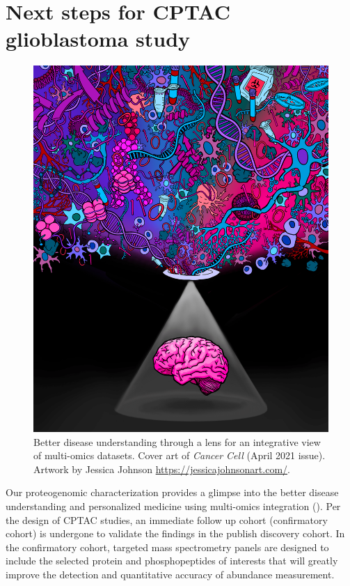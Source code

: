 \section{Next steps for CPTAC glioblastoma study}

\begin{figure}[tb]
    \centering
    \includegraphics[width=0.6\linewidth]{figures/chap05_conclusion/cptac_gbm_cancer_cell_cover.png}
    \caption[Better disease understanding through a lens for an integrative view of multi-omics datasets.]{Better disease understanding through a lens for an integrative view of multi-omics datasets. Cover art of \textit{Cancer Cell} (April 2021 issue). Artwork by Jessica Johnson \url{https://jessicajohnsonart.com/}.}
    \label{fig:lens-multi-omics}
\end{figure}

Our proteogenomic characterization provides a glimpse into the better disease understanding and personalized medicine using multi-omics integration (). Per the design of CPTAC studies, an immediate follow up cohort (confirmatory cohort) is undergone to validate the findings in the publish discovery cohort. In the confirmatory cohort, targeted mass spectrometry panels are designed to include the selected protein and phosphopeptides of interests that will greatly improve the detection and quantitative accuracy of abundance measurement.


